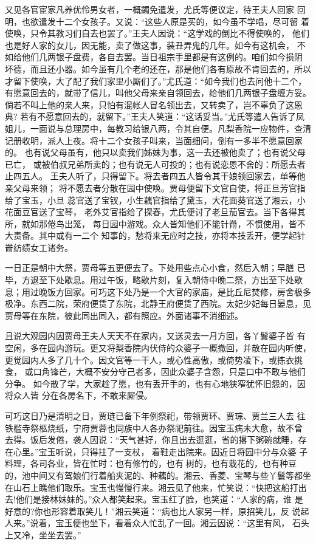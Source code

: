 又见各官宦家凡养优伶男女者，一概蠲免遣发，尤氏等便议定，待王夫人回家
回明，也欲遣发十二个女孩子。又说：“这些人原是买的，如今虽不学唱，尽可留
着使唤，只令其教习们自去也罢了。”王夫人因说：“这学戏的倒比不得使唤的，
他们也是好人家的女儿，因无能，卖了做这事，装丑弄鬼的几年。如今有这机会，
不如给他们几两银子盘费，各自去罢。当日祖宗手里都是有这例的。咱们如今损阴
坏德，而且还小器。如今虽有几个老的还在，那是他们各有原故不肯回去的，所以
才留下使唤，大了配了我们家里小厮们了。”尤氏道：“如今我们也去问他十二个，
有愿意回去的，就带了信儿，叫他父母来亲自领回去，给他们几两银子盘缠方妥。
倘若不叫上他的亲人来，只怕有混帐人冒名领出去，又转卖了，岂不辜负了这恩典?
若有不愿意回去的，就留下。”王夫人笑道：“这话妥当。”尤氏等遣人告诉了凤
姐儿，一面说与总理房中，每教习给银八两，令其自便。凡梨香院一应物件，查清
记册收明，派人上夜。将十二个女孩子叫来，当面细问，倒有一多半不愿意回家的。
也有说父母虽有，他只以卖我们姊妹为事，这一去还被他卖了；也有说父母已亡，
或被伯叔兄弟所卖的；也有说无人可投的；也有说恋恩不舍的：所愿去者止四五人。
王夫人听了，只得留下。将去者四五人皆令其干娘领回家去，单等他亲父母来领；
将不愿去者分散在园中使唤。贾母便留下文官自使，将正旦芳官指给了宝玉，小旦
蕊官送了宝钗，小生藕官指给了黛玉，大花面葵官送了湘云，小花面豆官送了宝琴，
老外艾官指给了探春，尤氏便讨了老旦茄官去。当下各得其所，就如那倦鸟出笼，
每日园中游戏。众人皆知他们不能针黹，不惯使用，皆不大责备。其中或有一二个
知事的，愁将来无应时之技，亦将本技丢开，便学起针黹纺绩女工诸务。

一日正是朝中大祭，贾母等五更便去了。下处用些点心小食，然后入朝；早膳
已毕，方退至下处歇息。用过午饭，略歇片刻，复入朝侍中晚二祭，方出至下处歇
息；用过晚饭方回家。可巧这下处乃是一个大官的家庙，是比丘尼焚修，房舍极多
极净。东西二院，荣府便赁了东院，北静王府便赁了西院。太妃少妃每日晏息，见
贾母等在东院，彼此同出同入，都有照应。外面诸事不消细述。

且说大观园内因贾母王夫人天天不在家内，又送灵去一月方回，各丫鬟婆子皆
有空闲，多在园内游玩。更又将梨香院内伏侍的众婆子一概撤回，并散在园内听使，
更觉园内人多了几十个。因文官等一干人，或心性高傲，或倚势凌下，或拣衣挑食，
或口角锋芒，大概不安分守己者多，因此众婆子含怨，只是口中不敢与他们分争。
如今散了学，大家趁了愿，也有丢开手的，也有心地狭窄犹怀旧怨的，因将众人皆
分在各房名下，不敢来厮侵。

可巧这日乃是清明之日，贾琏已备下年例祭祀，带领贾环、贾琮、贾兰三人去
往铁槛寺祭柩烧纸，宁府贾蓉也同族中人各办祭祀前往。因宝玉病未大愈，故不曾
去得。饭后发倦，袭人因说：“天气甚好，你且出去逛逛，省的撂下粥碗就睡，存
在心里。”宝玉听说，只得拄了一支杖，着鞋走出院来。因近日将园中分与众婆
子料理，各司各业，皆在忙时：也有修竹的，也有树的，也有栽花的，也有种豆
的，池中间又有驾娘们行着船夹泥的、种藕的。湘云、香菱、宝琴与些丫鬟等都坐
在山石上瞧他们取乐。宝玉也慢慢行来。湘云见了他来，忙笑说：“快把这船打出
去!他们是接林妹妹的。”众人都笑起来。宝玉红了脸，也笑道：“人家的病，谁
是好意的?你也形容着取笑儿！”湘云笑道：“病也比人家另一样，原招笑儿，反
说起人来。”说着，宝玉便也坐下，看着众人忙乱了一回。湘云因说：“这里有风，
石头上又冷，坐坐去罢。”

